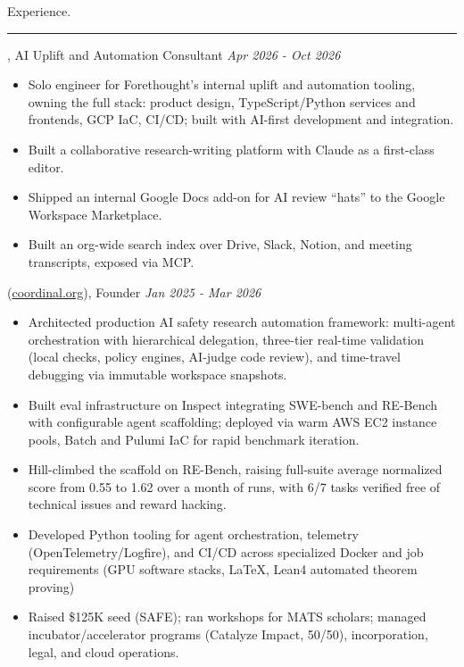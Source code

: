 \documentclass[]{article}
\begin{document}
\vspace{10pt}
{\LARGE Experience.}
\hrule
\vspace{10pt}

, AI Uplift and Automation Consultant \hfill \textit{Apr 2026 - Oct 2026}
\begin{itemize}[label={$\bullet$}]
	\item Solo engineer for Forethought's internal uplift and automation tooling, owning the full stack: product design, TypeScript/Python services and frontends, GCP IaC, CI/CD; built with AI-first development and integration.
	\item Built a collaborative research-writing platform with Claude as a first-class editor.
	\item Shipped an internal Google Docs add-on for AI review ``hats'' to the Google Workspace Marketplace.
	\item Built an org-wide search index over Drive, Slack, Notion, and meeting transcripts, exposed via MCP.
\end{itemize}

 (\href{https://coordinal.org}{coordinal.org}), Founder \hfill \textit{Jan 2025 - Mar 2026}
\begin{itemize}[label={$\bullet$}]
	\item Architected production AI safety research automation framework: multi-agent orchestration with hierarchical delegation, three-tier real-time validation (local checks, policy engines, AI-judge code review), and time-travel debugging via immutable workspace snapshots.
	\item Built eval infrastructure on Inspect integrating SWE-bench and RE-Bench with configurable agent scaffolding; deployed via warm AWS EC2 instance pools, Batch and Pulumi IaC for rapid benchmark iteration.
	\item Hill-climbed the scaffold on RE-Bench, raising full-suite average normalized score from 0.55 to 1.62 over a month of runs, with 6/7 tasks verified free of technical issues and reward hacking.
	\item Developed Python tooling for agent orchestration, telemetry (OpenTelemetry/Logfire), and CI/CD across specialized Docker and job requirements (GPU software stacks, \LaTeX, Lean4 automated theorem proving)
	\item Raised \$125K seed (SAFE); ran workshops for MATS scholars; managed incubator/accelerator programs (Catalyze Impact, 50/50), incorporation, legal, and cloud operations.
\end{itemize}
\end{document}
